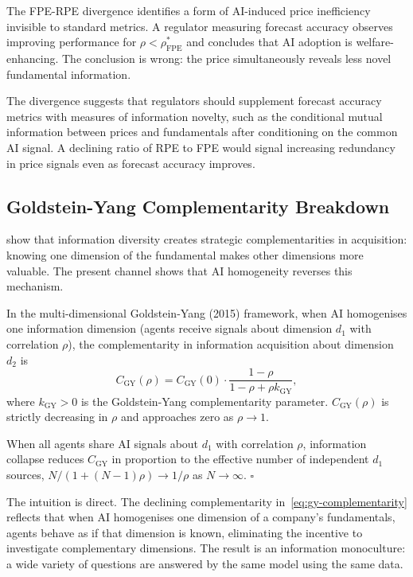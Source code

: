 The FPE-RPE divergence identifies a form of AI-induced price inefficiency invisible to standard metrics. A regulator measuring forecast accuracy observes improving performance for $\rho < \rho_{\text{FPE}}^*$ and concludes that AI adoption is welfare-enhancing. The conclusion is wrong: the price simultaneously reveals less novel fundamental information.

The divergence suggests that regulators should supplement forecast accuracy metrics with measures of information novelty, such as the conditional mutual information between prices and fundamentals after conditioning on the common AI signal. A declining ratio of RPE to FPE would signal increasing redundancy in price signals even as forecast accuracy improves.

\subsection{Goldstein-Yang Complementarity Breakdown}

\citet{goldstein2015} show that information diversity creates strategic complementarities in acquisition: knowing one dimension of the fundamental makes other dimensions more valuable. The present channel shows that AI homogeneity reverses this mechanism.

\begin{proposition}\label{prop:gy-breakdown}
  In the multi-dimensional Goldstein-Yang (2015) framework, when AI homogenises one information dimension (agents receive signals about dimension $d_1$ with correlation $\rho$), the complementarity in information acquisition about dimension $d_2$ is
  \begin{equation}\label{eq:gy-complementarity}
    C_{\text{GY}}(\rho) = C_{\text{GY}}(0) \cdot \frac{1-\rho}{1-\rho+\rho k_{\text{GY}}},
  \end{equation}
  where $k_{\text{GY}} > 0$ is the Goldstein-Yang complementarity parameter. $C_{\text{GY}}(\rho)$ is strictly decreasing in $\rho$ and approaches zero as $\rho \to 1$.

   When all agents share AI signals about $d_1$ with correlation $\rho$, information collapse reduces $C_{\text{GY}}$ in proportion to the effective number of independent $d_1$ sources, $N/(1+(N-1)\rho) \to 1/\rho$ as $N \to \infty$. $\square$
\end{proposition}

The intuition is direct. The declining complementarity in~\eqref{eq:gy-complementarity} reflects that when AI homogenises one dimension of a company's fundamentals, agents behave as if that dimension is known, eliminating the incentive to investigate complementary dimensions. The result is an information monoculture: a wide variety of questions are answered by the same model using the same data.

